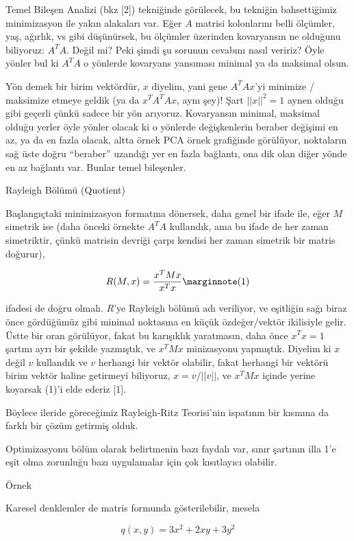 \documentclass[12pt,fleqn]{article}\usepackage{../../common}
\begin{document}
Temel Bileşen Analizi (bkz [2]) tekniğinde görülecek, bu tekniğin
bahsettiğimiz minimizasyon ile yakın alakaları var. Eğer $A$ matrisi
kolonlarını belli ölçümler, yaş, ağırlık, vs gibi düşünürsek, bu ölçümler
üzerinden kovaryansın ne olduğunu biliyoruz: $A^TA$. Değil mi? Peki şimdi
şu sorunun cevabını nasıl veririz?  Öyle yönler bul ki $A^TA$ o yönlerde
kovaryans yansıması minimal ya da maksimal olsun.

Yön demek bir birim vektördür, $x$ diyelim, yani gene $A^TAx$'yi minimize /
maksimize etmeye geldik (ya da $x^TA^TAx$, aynı şey)! Şart $||x||^2 = 1$ aynen
olduğu gibi geçerli çünkü sadece bir yön arıyoruz. Kovaryansın minimal, maksimal
olduğu yerler öyle yönler olacak ki o yönlerde değişkenlerin beraber değişimi en
az, ya da en fazla olacak, altta örnek PCA örnek grafiğinde görülüyor,
noktaların sağ üste doğru ``beraber'' uzandığı yer en fazla bağlantı, ona dik
olan diğer yönde en az bağlantı var. Bunlar temel bileşenler.

Rayleigh Bölümü (Quotient)

Başlangıçtaki minimizasyon formatına dönersek, daha genel bir ifade ile, eğer
$M$ simetrik ise (daha önceki örnekte $A^TA$ kullandık, ama bu ifade de her
zaman simetriktir, çünkü matrisin devriği çarpı kendisi her zaman simetrik bir
matris doğurur),

$$ 
R(M,x) = \frac{x^TMx}{x^Tx} 
\mlabel{1} 
$$

ifadesi de doğru olmalı. $R$'ye Rayleigh bölümü adı veriliyor, ve eşitliğin sağı
biraz önce gördüğümüz gibi minimal noktasına en küçük özdeğer/vektör ikilisiyle
gelir. Üstte bir oran görülüyor, fakat bu karışıklık yaratmasın, daha önce $x^Tx
= 1$ şartını ayrı bir şekilde yazmıştık, ve $x^T M x$ minizasyonu
yapmıştık. Diyelim ki $x$ değil $v$ kullandık ve $v$ herhangi bir vektör
olabilir, fakat herhangi bir vektörü birim vektör haline getirmeyi biliyoruz, $x
= v/||v||$, ve $x^T M x$ içinde yerine koyarsak (1)'i elde ederiz [1].

Böylece ileride göreceğimiz Rayleigh-Ritz Teorisi'nin ispatının bir kısmına da
farklı bir çözüm getirmiş olduk.

Optimizasyonu bölüm olarak belirtmenin bazı faydalı var, sınır şartının illa 1'e
eşit olma zorunluğu bazı uygulamalar için çok kısıtlayıcı olabilir.

Örnek

Karesel denklemler de matris formunda gösterilebilir, mesela

$$ q(x,y) = 3x^2 + 2xy + 3y^2 $$
\end{document}
